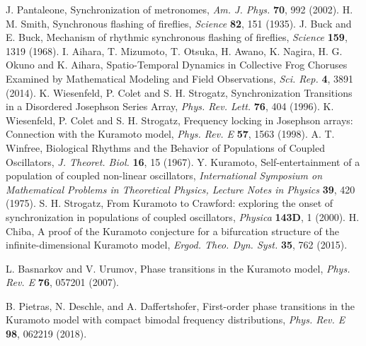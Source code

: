 \begin{thebibliography}{99}
  J. Pantaleone, Synchronization of metronomes, \textit{Am. J. Phys.} \textbf{70}, 992 (2002).
  H. M. Smith, Synchronous flashing of fireflies, \textit{Science} \textbf{82}, 151 (1935).
  J. Buck and E. Buck, Mechanism of rhythmic synchronous flashing of fireflies, \textit{Science} \textbf{159}, 1319 (1968).
  I. Aihara, T. Mizumoto, T. Otsuka, H. Awano, K. Nagira, H. G. Okuno and K. Aihara,
  Spatio-Temporal Dynamics in Collective Frog Choruses Examined by Mathematical Modeling and Field Observations,
  \textit{Sci. Rep.} {\bf 4}, 3891 (2014).
  K. Wiesenfeld, P. Colet and S. H. Strogatz,
  Synchronization Transitions in a Disordered Josephson Series Array,
  \textit{Phys. Rev. Lett.} {\bf 76}, 404 (1996).
  K. Wiesenfeld, P. Colet and S. H. Strogatz,
  Frequency locking in Josephson arrays: Connection with the Kuramoto model,
  \textit{Phys. Rev. E} {\bf 57}, 1563 (1998).
  A. T. Winfree,
  Biological Rhythms and the Behavior of Populations of Coupled Oscillators,
  \textit{J. Theoret. Biol.} {\bf 16}, 15 (1967).
  Y. Kuramoto, Self-entertainment of a population of coupled non-linear oscillators, \textit{International Symposium on Mathematical Problems in Theoretical Physics, Lecture Notes in Physics} \textbf{39}, 420 (1975).
  S. H. Strogatz, From Kuramoto to Crawford: exploring the onset of synchronization in populations of coupled oscillators, \textit{Physica} \textbf{143D}, 1 (2000).
  H. Chiba, A proof of the Kuramoto conjecture for a bifurcation structure of the infinite-dimensional Kuramoto model, \textit{Ergod. Theo. Dyn. Syst.} \textbf{35}, 762 (2015).

  L. Basnarkov and V. Urumov,
  Phase transitions in the Kuramoto model,
  \textit{Phys. Rev. E} \textbf{76}, 057201 (2007).
  
  B. Pietras, N. Deschle, and A. Daffertshofer,
  First-order phase transitions in the Kuramoto model with compact bimodal frequency distributions,
  \textit{Phys. Rev. E} \textbf{98}, 062219 (2018).
  



\end{thebibliography}
